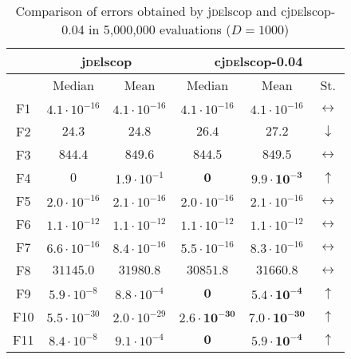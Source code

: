 \begin{table*}[!t]
\caption{Comparison of errors obtained by j\textsc{de}lscop and cj\textsc{de}lscop-0.04 in 5,000,000 evaluations ($D = 1000$)}
\label{tab:jdelscop}
\centering
\begin{scriptsize}
\begin{tabular}{c || c c | c c c}
\hline
 & \multicolumn{2}{|c|}{j\textsc{de}lscop} & \multicolumn{3}{|c||}{cj\textsc{de}lscop-0.04} \\ \hline
    & Median               & Mean                  & Median                        & Mean                          & St.               \\ \hline
F1  & $4.1 \cdot 10^{-16}$ & $4.1 \cdot 10^{-16}$  & $4.1 \cdot 10^{-16}$          & $4.1 \cdot 10^{-16}$          & $\leftrightarrow$ \\ \hline
F2  & $\mathbf{24.3}$      & $\mathbf{24.8}$       & $26.4$                        & $27.2$                        & $\downarrow$      \\ \hline
F3  & $844.4$              & $849.6$               & $844.5$                       & $849.5$                       & $\leftrightarrow$ \\ \hline
F4  & $0$                  & $1.9 \cdot 10^{-1}$   & $\mathbf{0}$                  & $\mathbf{9.9 \cdot 10^{-3}}$  & $\uparrow$        \\ \hline
F5  & $2.0 \cdot 10^{-16}$ & $2.1 \cdot 10^{-16}$  & $2.0 \cdot 10^{-16}$          & $2.1 \cdot 10^{-16}$          & $\leftrightarrow$ \\ \hline
F6  & $1.1 \cdot 10^{-12}$ & $1.1 \cdot 10^{-12}$  & $1.1 \cdot 10^{-12}$          & $1.1 \cdot 10^{-12}$          & $\leftrightarrow$ \\ \hline
F7  & $6.6 \cdot 10^{-16}$ & $8.4 \cdot 10^{-16}$  & $5.5 \cdot 10^{-16}$          & $8.3 \cdot 10^{-16}$          & $\leftrightarrow$ \\ \hline
F8  & $31145.0$            & $31980.8$             & $30851.8$                     & $31660.8$                     & $\leftrightarrow$ \\ \hline
F9  & $5.9 \cdot 10^{-8}$  & $8.8 \cdot 10^{-4}$   & $\mathbf{0}$                  & $\mathbf{5.4 \cdot 10^{-4}}$  & $\uparrow$        \\ \hline
F10 & $5.5 \cdot 10^{-30}$ & $2.0 \cdot 10^{-29}$  & $\mathbf{2.6 \cdot 10^{-30}}$ & $\mathbf{7.0 \cdot 10^{-30}}$ & $\uparrow$        \\ \hline
F11 & $8.4 \cdot 10^{-8}$  & $9.1 \cdot 10^{-4}$   & $\mathbf{0}$                  & $\mathbf{5.9 \cdot 10^{-4}}$  & $\uparrow$        \\ \hline

\end{tabular}
\end{scriptsize}
\end{table*}
